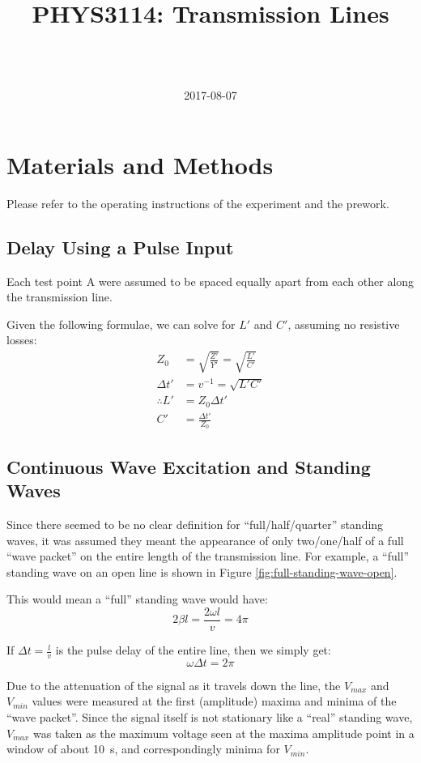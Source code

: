 \documentclass[a4paper]{scrartcl}
\begin{document}
\title{PHYS3114: Transmission Lines}
\author{ \\ \\ }
\date{2017-08-07}
\maketitle

\section{Materials and Methods}
Please refer to the operating instructions of the experiment and the prework.

\subsection{Delay Using a Pulse Input}
Each test point A were assumed to be spaced equally apart from each other along the transmission line.

Given the following formulae, we can solve for \(L'\) and \(C'\), assuming no resistive losses:
\begin{align*}
    Z_0 &= \sqrt{\frac{Z'}{Y'}} = \sqrt{\frac{L'}{C'}} \\
    \Delta t' &= v^{-1} = \sqrt{L' C'} \\
    \therefore L' &= Z_0 \Delta t' \\
    C' &= \frac{\Delta t'}{Z_0}
\end{align*}

\subsection{Continuous Wave Excitation and Standing Waves}
Since there seemed to be no clear definition for ``full/half/quarter'' standing waves, it was assumed they meant the appearance of only two/one/half of a full ``wave packet'' on the entire length of the transmission line. For example, a ``full'' standing wave on an open line is shown in Figure \ref{fig:full-standing-wave-open}.

This would mean a ``full'' standing wave would have:
\[2 \beta l = \frac{2 \omega l}{v} = 4 \pi\]

If \(\Delta t = \frac{l}{v}\) is the pulse delay of the entire line, then we simply get:
\[\omega \Delta t = 2 \pi\]

Due to the attenuation of the signal as it travels down the line, the \(V_{max}\) and \(V_{min}\) values were measured at the first (amplitude) maxima and minima of the ``wave packet''. Since the signal itself is not stationary like a ``real'' standing wave, \(V_{max}\) was taken as the maximum voltage seen at the maxima amplitude point in a window of about \SI{10}{\second}, and correspondingly minima for \(V_{min}\).
\end{document}
